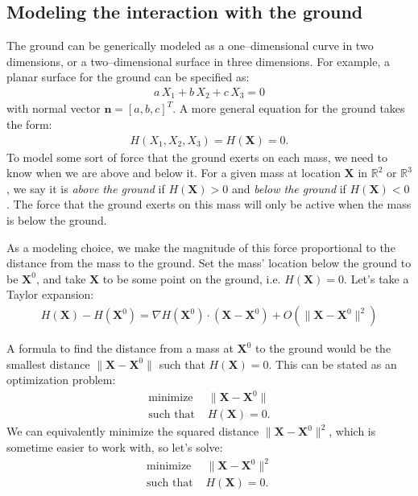 \documentclass[10pt]{article}
\newcommand{\bs}[1]{{\boldsymbol #1}}
\begin{document}
\subsection{Modeling the interaction with the ground}

The ground can be generically modeled as a one--dimensional curve in two dimensions, or a two--dimensional surface in three dimensions.  For example, a planar surface for the ground can be specified as:
\begin{align*}
a \, X_1 + b\, X_2 + c \,X_3 = 0
\end{align*}
with normal vector ${\bs n} = [a,b,c]^T$.  A more general equation for the ground takes the form:
\begin{align*}
H(X_1,X_2,X_3) = H({\bs X}) = 0.
\end{align*}
To model some sort of force that the ground exerts on each mass, we need to know when we are above and below it.  For a given mass at location ${\bs X}$ in $\mathbb{R}^2$ or $\mathbb{R}^3$, we say it is {\em above the ground} if $H({\bs X}) > 0$ and {\em below the ground} if $H({\bs X}) < 0$.  The force that the ground exerts on this mass will only be active when the mass is below the ground.

As a modeling choice, we make the magnitude of this force proportional to the distance from the mass to the ground.  Set the mass' location below the ground to be ${\bs X}^0$, and take ${\bs X}$ to be some point on the ground, i.e. $H({\bs X}) = 0$.  Let's take a Taylor expansion:
\begin{align}
\label{eq:te1}
H({\bs X}) - H({\bs X}^0) = \nabla H({\bs X}^0) \cdot ({\bs X} - {\bs X}^0) + O(\|{\bs X} - {\bs X}^0\|^2) 
\end{align}  

A formula to find the distance from a mass at ${\bs X}^0$ to the ground would be the smallest distance $\|{\bs X} - {\bs X}^0\|$ such that $H({\bs X}) = 0$.  This can be stated as an optimization problem:
\begin{align*}
\text{minimize } &\|{\bs X} - {\bs X}^0\| \\
\text{such that } &H({\bs X}) = 0.
\end{align*}
We can equivalently minimize the squared distance $\|{\bs X} - {\bs X}^0\|^2$, which is sometime easier to work with, so let's solve:
\begin{align*}
\text{minimize } &\|{\bs X} - {\bs X}^0\|^2 \\
\text{such that } &H({\bs X}) = 0.
\end{align*}
\end{document}
